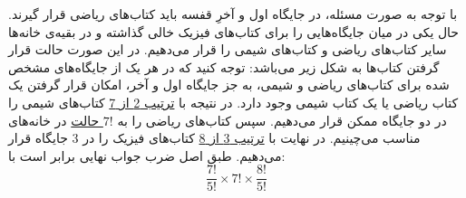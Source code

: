 \p
 با توجه به صورت مسئله، در جایگاه اول و آخرِ قفسه باید کتاب‌های ریاضی قرار گیرند.
  حال یکی در میان جایگاه‌هایی را برای کتاب‌های فیزیک خالی گذاشته و در بقیه‌ی خانه‌ها سایر کتاب‌های ریاضی و کتاب‌های شیمی را قرار می‌دهیم.
 در این صورت حالت قرار گرفتن کتاب‌ها به شکل زیر می‌باشد:
\vspace*{+0.5cm}
\vspace*{+0.4cm}
\p
توجه کنید که در هر یک از جایگاه‌های مشخص شده برای کتاب‌های ریاضی و شیمی، به جز جایگاه اول و آخر، امکان قرار گرفتن یک کتاب ریاضی یا یک کتاب شیمی وجود دارد. 
در نتیجه با
\underline{ترتیب 2 از 7}
کتاب‌های شیمی را در دو جایگاه ممکن 
 قرار می‌دهیم.
 سپس کتاب‌‌های ریاضی را به
 \underline{$7!$ حالت}
 در خانه‌های مناسب
 می‌چینیم.
 در نهایت با
 \underline{ترتیب 3 از 8}
  کتاب‌های فیزیک را
در 3 جایگاه قرار می‌دهیم.
  طبق اصل ضرب جواب نهایی برابر است با:
$$\frac{7!}{5!}\times7! \times \frac{8!}{5!}$$
